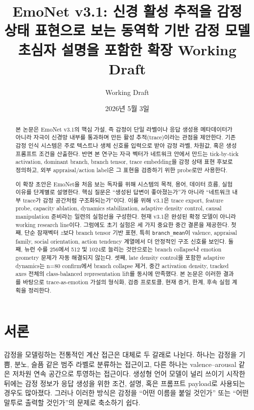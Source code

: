 \documentclass[11pt,a4paper]{article}
\title{\textbf{EmoNet v3.1: 신경 활성 추적을 감정 상태 표현으로 보는 동역학 기반 감정 모델}\\
\large 초심자 설명을 포함한 확장 Working Draft}
\author{Working Draft}
\date{2026년 5월 3일}
\begin{document}
\maketitle

\begin{abstract}
본 논문은 EmoNet v3.1의 핵심 가설, 즉 감정이 단일 라벨이나 응답 생성용 메타데이터가 아니라 자극이 신경망 내부를 통과하며 만든 활성 추적(trace)이라는 관점을 제안한다. 기존 감정 인식 시스템은 주로 텍스트나 생체 신호를 입력으로 받아 감정 라벨, 차원값, 혹은 생성 프롬프트 조건을 산출한다. 반면 본 연구는 자극 벡터가 네트워크 안에서 만드는 tick-by-tick activation, dominant branch, branch tensor, trace embedding을 감정 상태 표현 후보로 정의하고, 외부 appraisal/action label은 그 표현을 검증하기 위한 probe로만 사용한다.

이 확장 초안은 EmoNet을 처음 보는 독자를 위해 시스템의 목적, 용어, 데이터 흐름, 실험 이유를 단계별로 설명한다. 핵심 질문은 ``생성된 답변이 좋아졌는가''가 아니라 ``네트워크 내부 trace가 감정 공간처럼 구조화되는가''이다. 이를 위해 v3.1은 trace export, feature probe, capacity ablation, dynamics stabilization, adaptive density control, causal manipulation 준비라는 일련의 실험선을 구성한다. 현재 v3.1은 완성된 확정 모델이 아니라 working research line이다. 그럼에도 초기 실험은 세 가지 중요한 중간 결론을 제공한다. 첫째, 단순 잠재벡터 \(z\)보다 branch tensor 기반 표현, 특히 \texttt{branch\_mean}이 valence, appraisal family, social orientation, action tendency 계열에서 더 안정적인 구조 신호를 보인다. 둘째, 뉴런 수를 256에서 512 및 1024로 늘리는 것만으로는 branch collapse나 emotion geometry 문제가 자동 해결되지 않는다. 셋째, late density control을 포함한 adaptive dynamics는 n=80 confirm에서 branch collapse 제거, 중간 activation density, tracked axes 전체의 class-balanced representation lift를 동시에 만족했다. 본 논문은 이러한 결과를 바탕으로 trace-as-emotion 가설의 형식화, 검증 프로토콜, 현재 증거, 한계, 후속 실험 계획을 정리한다.
\end{abstract}

\tableofcontents
\newpage

\section{서론}

감정을 모델링하는 전통적인 계산 접근은 대체로 두 갈래로 나뉜다. 하나는 감정을 기쁨, 분노, 슬픔 같은 범주 라벨로 분류하는 접근이고, 다른 하나는 valence--arousal 같은 저차원 연속 공간으로 투영하는 접근이다. 생성형 언어 모델이 널리 쓰이기 시작한 뒤에는 감정 정보가 응답 생성을 위한 조건, 설명, 혹은 프롬프트 payload로 사용되는 경우도 많아졌다. 그러나 이러한 방식은 감정을 ``어떤 이름을 붙일 것인가'' 또는 ``어떤 말투로 출력할 것인가''의 문제로 축소하기 쉽다.
\end{document}
